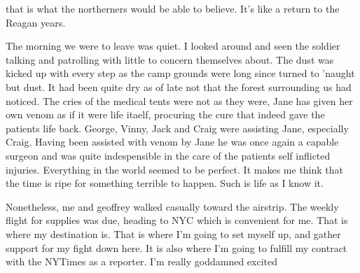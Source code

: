 that is what the northerners would be able to believe. It's like a return to the Reagan years.
 
 The morning we were to leave was quiet. I looked around and seen the soldier talking and patrolling with little to concern themselves about. The dust was kicked up with every step as the camp grounds were long since turned to 'naught but dust. It had been quite dry as of late not that the forest surrounding us had noticed. The cries of the medical tents were not as they were, Jane has given her own venom as if it were life itaelf, procuring the cure that indeed gave the patients life back. George, Vinny, Jack and Craig were assisting Jane, especially Craig. Having been assisted with venom by Jane he was once again a  capable surgeon and was quite indespensible in the care of the patients self inflicted injuries. Everything in the world seemed to be perfect. It makes me think that the time is ripe for something terrible to happen. Such is life as I know it.
 
 Nonetheless, me and geoffrey walked casually toward the airstrip. The weekly flight for supplies was due, heading to NYC which is convenient for me. That is where my destination is.  That is where I'm going to set myself up, and gather support for my fight down here. It is also where I'm going to fulfill my contract with the NYTimes as a reporter. I'm really goddamned excited
 
